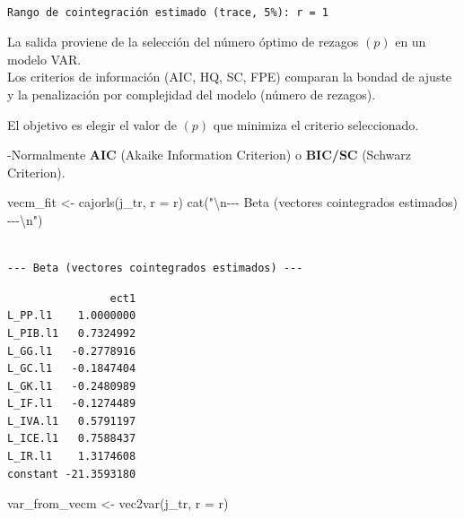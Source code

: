 \documentclass[
  spanish,
  letterpaper,
  DIV=11,
  numbers=noendperiod]{scrartcl}
\newenvironment{Shaded}{\begin{snugshade}}{\end{snugshade}}
\newcommand{\AttributeTok}[1]{\textcolor[rgb]{0.40,0.45,0.13}{#1}}
\newcommand{\FunctionTok}[1]{\textcolor[rgb]{0.28,0.35,0.67}{#1}}
\newcommand{\NormalTok}[1]{\textcolor[rgb]{0.00,0.23,0.31}{#1}}
\newcommand{\OtherTok}[1]{\textcolor[rgb]{0.00,0.23,0.31}{#1}}
\newcommand{\SpecialCharTok}[1]{\textcolor[rgb]{0.37,0.37,0.37}{#1}}
\newcommand{\StringTok}[1]{\textcolor[rgb]{0.13,0.47,0.30}{#1}}
\begin{document}
\begin{verbatim}

Rango de cointegración estimado (trace, 5%): r = 1 
\end{verbatim}

La salida proviene de la selección del número óptimo de rezagos \((p)\)
en un modelo VAR.\\

Los criterios de información (AIC, HQ, SC, FPE) comparan la bondad de
ajuste y la penalización por complejidad del modelo (número de rezagos).

El objetivo es elegir el valor de \((p)\) que minimiza el criterio
seleccionado.

-Normalmente \textbf{AIC} (Akaike Information Criterion) o
\textbf{BIC/SC} (Schwarz Criterion).

\begin{Shaded}
\begin{Highlighting}[]
\NormalTok{vecm\_fit }\OtherTok{\textless{}{-}} \FunctionTok{cajorls}\NormalTok{(j\_tr, }\AttributeTok{r =}\NormalTok{ r)}
\FunctionTok{cat}\NormalTok{(}\StringTok{"}\SpecialCharTok{\textbackslash{}n}\StringTok{{-}{-}{-} Beta (vectores cointegrados estimados) {-}{-}{-}}\SpecialCharTok{\textbackslash{}n}\StringTok{"}\NormalTok{)}
\end{Highlighting}
\end{Shaded}

\begin{verbatim}

--- Beta (vectores cointegrados estimados) ---
\end{verbatim}

\begin{Shaded}
\end{Shaded}

\begin{verbatim}
                ect1
L_PP.l1    1.0000000
L_PIB.l1   0.7324992
L_GG.l1   -0.2778916
L_GC.l1   -0.1847404
L_GK.l1   -0.2480989
L_IF.l1   -0.1274489
L_IVA.l1   0.5791197
L_ICE.l1   0.7588437
L_IR.l1    1.3174608
constant -21.3593180
\end{verbatim}

\begin{Shaded}
\begin{Highlighting}[]
\NormalTok{var\_from\_vecm }\OtherTok{\textless{}{-}} \FunctionTok{vec2var}\NormalTok{(j\_tr, }\AttributeTok{r =}\NormalTok{ r)  }
\end{Highlighting}
\end{Shaded}
\end{document}
